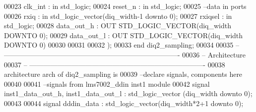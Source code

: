 \begin{DoxyCode}
00023         \textcolor{vhdlchar}{clk_int}         \textcolor{vhdlchar}{:} \textcolor{keywordflow}{in} \textcolor{comment}{std\_logic};
00024         \textcolor{vhdlchar}{reset_n}         \textcolor{vhdlchar}{:} \textcolor{keywordflow}{in} \textcolor{comment}{std\_logic};
00025 \textcolor{keyword}{        --data in ports}
00026         \textcolor{vhdlchar}{rxiq}                \textcolor{vhdlchar}{:} \textcolor{keywordflow}{in} \textcolor{comment}{std\_logic\_vector}\textcolor{vhdlchar}{(}\textcolor{vhdlchar}{diq_width}\textcolor{vhdlchar}{-}\textcolor{vhdllogic}{}\textcolor{vhdllogic}{1} \textcolor{keywordflow}{downto} \textcolor{vhdllogic}{}\textcolor{vhdllogic}{0}\textcolor{vhdlchar}{)};
00027         \textcolor{vhdlchar}{rxiqsel}         \textcolor{vhdlchar}{:} \textcolor{keywordflow}{in} \textcolor{comment}{std\_logic};
00028         \textcolor{vhdlchar}{data_out_h}      \textcolor{vhdlchar}{:} \textcolor{keywordflow}{OUT} \textcolor{comment}{STD\_LOGIC\_VECTOR}\textcolor{vhdlchar}{(}\textcolor{vhdlchar}{diq_width} \textcolor{keywordflow}{DOWNTO} \textcolor{vhdllogic}{}\textcolor{vhdllogic}{0}\textcolor{vhdlchar}{)};
00029         \textcolor{vhdlchar}{data_out_l}      \textcolor{vhdlchar}{:} \textcolor{keywordflow}{OUT} \textcolor{comment}{STD\_LOGIC\_VECTOR}\textcolor{vhdlchar}{(}\textcolor{vhdlchar}{diq_width} \textcolor{keywordflow}{DOWNTO} \textcolor{vhdllogic}{}\textcolor{vhdllogic}{0}\textcolor{vhdlchar}{)}
00030 
00031         
00032         \textcolor{vhdlchar}{)};
00033 \textcolor{keywordflow}{end} \textcolor{vhdlchar}{diq2\_sampling};
00034 
00035 \textcolor{keyword}{-- ----------------------------------------------------------------------------}
00036 \textcolor{keyword}{-- Architecture}
00037 \textcolor{keyword}{-- ----------------------------------------------------------------------------}
00038 \textcolor{keywordflow}{architecture} arch \textcolor{keywordflow}{of} diq2_sampling is
00039 \textcolor{keyword}{--declare signals,  components here}
00040 
00041 \textcolor{keyword}{--signals from lms7002\_ddin inst1 module}
00042 \textcolor{keywordflow}{signal} \textcolor{vhdlchar}{inst1_data_out_h}\textcolor{vhdlchar}{,} \textcolor{vhdlchar}{inst1_data_out_l} \textcolor{vhdlchar}{:} \textcolor{comment}{std\_logic\_vector} \textcolor{vhdlchar}{(}\textcolor{vhdlchar}{diq_width} \textcolor{keywordflow}{downto} \textcolor{vhdllogic}{}\textcolor{vhdllogic}{0}\textcolor{vhdlchar}{)};
00043 
00044 \textcolor{keywordflow}{signal} \textcolor{vhdlchar}{dddin_data}   \textcolor{vhdlchar}{:} \textcolor{comment}{std\_logic\_vector}\textcolor{vhdlchar}{(}\textcolor{vhdlchar}{diq_width}\textcolor{vhdlchar}{*}\textcolor{vhdllogic}{}\textcolor{vhdllogic}{2+1} \textcolor{keywordflow}{downto} \textcolor{vhdllogic}{}\textcolor{vhdllogic}{0}\textcolor{vhdlchar}{)};

\end{DoxyCode}
